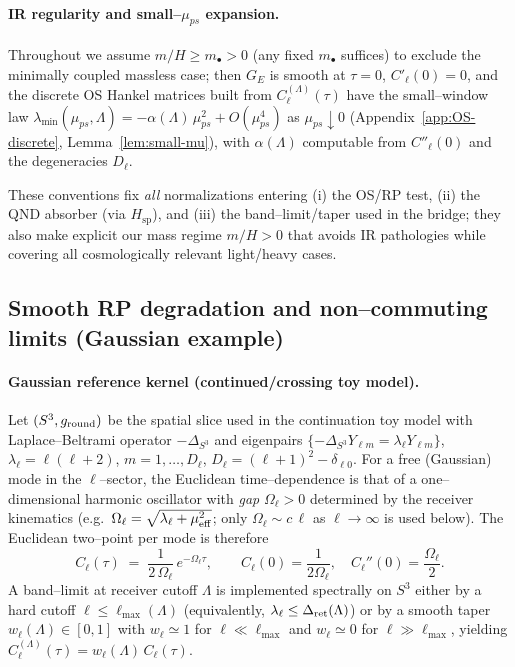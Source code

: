 \documentclass[10pt]{article}
\theoremstyle{definition}
\theoremstyle{plain}
\begin{document}
\paragraph{IR regularity and small–$\mu_{ps}$ expansion.}\label{par:uom-main-239}
Throughout we assume $m/H\ge m_\bullet>0$ (any fixed $m_\bullet$ suffices) to
exclude the minimally coupled massless case; then $G_E$ is smooth at
$\tau=0$, $C'_\ell(0)=0$, and the discrete OS Hankel matrices built from
$C_\ell^{(\Lambda)}(\tau)$ have the small–window law
$\lambda_{\min}(\mu_{ps},\Lambda)=-\alpha(\Lambda)\,\mu_{ps}^2+O(\mu_{ps}^4)$ as
$\mu_{ps}\downarrow 0$ (Appendix~\ref{app:OS-discrete}, Lemma~\ref{lem:small-mu}),
with $\alpha(\Lambda)$ computable from $C''_\ell(0)$ and the degeneracies $D_\ell$.

\medskip
These conventions fix \emph{all} normalizations entering (i) the OS/RP test,
(ii) the QND absorber (via $H_{\mathrm{sp}}$), and (iii) the band–limit/taper
used in the bridge; they also make explicit our mass regime $m/H>0$ that avoids
IR pathologies while covering all cosmologically relevant light/heavy cases.

\subsection{Smooth RP degradation and non–commuting limits (Gaussian example)}
\label{subsec:smooth-RP-noncommuting}

\paragraph{Gaussian reference kernel (continued/crossing toy model).}\label{par:uom-main-240}
Let $(S^3,g_{\rm round})$ be the spatial slice used in the continuation toy model with Laplace–Beltrami operator 
$-\Delta_{S^3}$ and eigenpairs $\{-\Delta_{S^3}Y_{\ell m}=\lambda_\ell Y_{\ell m}\}$, 
$\lambda_\ell=\ell(\ell+2)$, $m=1,\dots,D_\ell$, $D_\ell=(\ell+1)^2-\delta_{\ell 0}$. 
For a free (Gaussian) mode in the $\ell$–sector, the Euclidean time–dependence is that of a 
one–dimensional harmonic oscillator with \emph{gap} $\Omega_\ell>0$ determined by the receiver 
kinematics (e.g.\ $\Omega_\ell=\sqrt{\lambda_\ell+\mu_{\rm eff}^2}$; only $\Omega_\ell\sim c\,\ell$ 
as $\ell\to\infty$ is used below). The Euclidean two–point per mode is therefore
\begin{equation}
  C_\ell(\tau)\;=\;\frac{1}{2\,\Omega_\ell}\,e^{-\Omega_\ell \tau},
  \qquad
  C_\ell(0)=\frac{1}{2\Omega_\ell},\quad C_\ell''(0)=\frac{\Omega_\ell}{2}.
  \label{eq:gaussian-mode}
\end{equation}
A band–limit at receiver cutoff $\Lambda$ is implemented spectrally on $S^3$ either by a hard 
cutoff $\ell\le \ell_{\max}(\Lambda)$ (equivalently, $\lambda_\ell\le \Delta_{\rm ret}(\Lambda)$) 
or by a smooth taper $w_\ell(\Lambda)\in[0,1]$ with $w_\ell\simeq 1$ for $\ell\ll \ell_{\max}$ 
and $w_\ell\simeq 0$ for $\ell\gg \ell_{\max}$, yielding 
\(
C_\ell^{(\Lambda)}(\tau)=w_\ell(\Lambda)\,C_\ell(\tau).
\)
\end{document}
